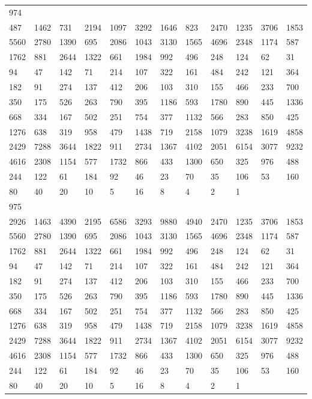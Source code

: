 \begin{longtable}{llllllllllll}
974&&&&&&&&&&&\\
487& 1462& 731& 2194& 1097& 3292& 1646& 823& 2470& 1235& 3706& 1853\\
5560& 2780& 1390& 695& 2086& 1043& 3130& 1565& 4696& 2348& 1174& 587\\
1762& 881& 2644& 1322& 661& 1984& 992& 496& 248& 124& 62& 31\\
94& 47& 142& 71& 214& 107& 322& 161& 484& 242& 121& 364\\
182& 91& 274& 137& 412& 206& 103& 310& 155& 466& 233& 700\\
350& 175& 526& 263& 790& 395& 1186& 593& 1780& 890& 445& 1336\\
668& 334& 167& 502& 251& 754& 377& 1132& 566& 283& 850& 425\\
1276& 638& 319& 958& 479& 1438& 719& 2158& 1079& 3238& 1619& 4858\\
2429& 7288& 3644& 1822& 911& 2734& 1367& 4102& 2051& 6154& 3077& 9232\\
4616& 2308& 1154& 577& 1732& 866& 433& 1300& 650& 325& 976& 488\\
244& 122& 61& 184& 92& 46& 23& 70& 35& 106& 53& 160\\
80& 40& 20& 10& 5& 16& 8& 4& 2& 1& \\

975&&&&&&&&&&&\\
2926& 1463& 4390& 2195& 6586& 3293& 9880& 4940& 2470& 1235& 3706& 1853\\
5560& 2780& 1390& 695& 2086& 1043& 3130& 1565& 4696& 2348& 1174& 587\\
1762& 881& 2644& 1322& 661& 1984& 992& 496& 248& 124& 62& 31\\
94& 47& 142& 71& 214& 107& 322& 161& 484& 242& 121& 364\\
182& 91& 274& 137& 412& 206& 103& 310& 155& 466& 233& 700\\
350& 175& 526& 263& 790& 395& 1186& 593& 1780& 890& 445& 1336\\
668& 334& 167& 502& 251& 754& 377& 1132& 566& 283& 850& 425\\
1276& 638& 319& 958& 479& 1438& 719& 2158& 1079& 3238& 1619& 4858\\
2429& 7288& 3644& 1822& 911& 2734& 1367& 4102& 2051& 6154& 3077& 9232\\
4616& 2308& 1154& 577& 1732& 866& 433& 1300& 650& 325& 976& 488\\
244& 122& 61& 184& 92& 46& 23& 70& 35& 106& 53& 160\\
80& 40& 20& 10& 5& 16& 8& 4& 2& 1& \\


\end{longtable}
